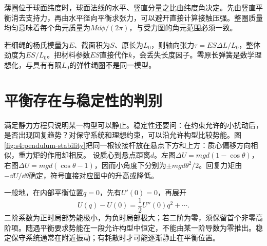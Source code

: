 薄圈位于球面纬度时，球面法线的水平、竖直分量之比由纬度角决定。先由竖直平衡消去支持力，再由水平径向平衡求张力，可以避开直接计算接触压强。整圈质量均匀意味着每个角元质量为$M\dd\phi/(2\pi)$，与受力图的角元范围必须一致。

若细绳的杨氏模量为$E$、截面积为$S$、原长为$L_0$，则轴向张力$\tau=ES\Delta L/L_0$，整体劲度为$ES/L_0$。把材料参数$ES$直接代作$k$，会丢失长度因子。零原长弹簧是数学理想化，与具有有限$L_0$的弹性绳圈不是同一模型。


\section{平衡存在与稳定性的判别}
满足静力方程只说明某一构型可以静止。稳定性还要问：在约束允许的小扰动后，是否出现回复趋势？对保守系统和理想约束，可以沿允许构型比较势能。图\ref{fig:s4:pendulum-stability}把同一根铰接杆放在悬点下方和上方：质心偏移方向相似，重力矩的作用却相反。
设质心到悬点距离$d$。左图$\Delta U=mgd(1-\cos\theta)$，右图$\Delta U=mgd(\cos\theta-1)$，因而小角度下分别为$\pm mgd\theta^2/2$。回复力矩由$-\dd U/\dd\theta$确定，符号直接对应图中的升高或降低。

一般地，在内部平衡位置$q=0$，先有$U'(0)=0$，再展开
\[
U(q)-U(0)=\frac12U''(0)q^2+\cdots.
\]
二阶系数为正时局部势能极小，为负时局部极大；若二阶为零，须保留首个非零高阶项。随遇平衡要求势能在一段允许构型中恒定，不能由某一阶导数为零推出。稳定保守系统通常在附近振动；有耗散时才可能逐渐静止在平衡位置。

